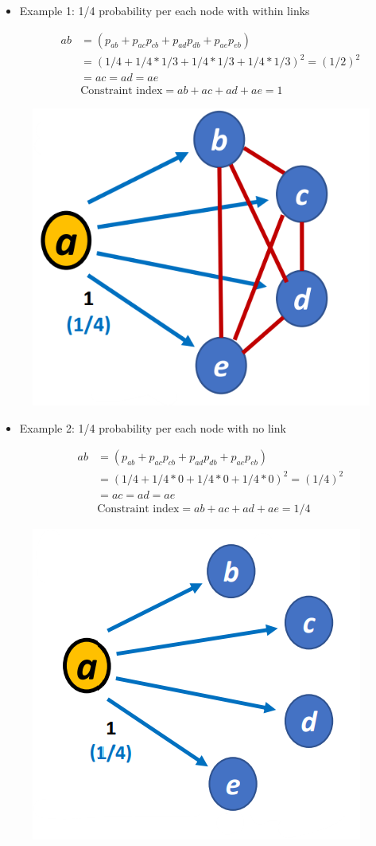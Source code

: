 \documentclass[
  notitlepage,
  onecolumn,
  openany]{book}
\begin{document}
\begin{itemize}
\item
  Example 1: 1/4 probability per each node with within links

  \[
    \begin{aligned}
    ab &= (p_{ab}+p_{ac}p_{cb}+p_{ad}p_{db}+p_{ae}p_{eb})
    \\&= (1/4+1/4*1/3+1/4*1/3+1/4*1/3)^2 =(1/2)^2 \\
    & = ac = ad = ae\\
    &\text{Constraint index} = ab+ac+ad+ae = 1
    \end{aligned}
    \]
\end{itemize}

\begin{figure}[h!]

{\centering \includegraphics[width=0.4\linewidth]{images/08-Metrics for structural holes/Untitled} 

}

\end{figure}

\begin{itemize}
\item
  Example 2: 1/4 probability per each node with no link

  \[
    \begin{aligned}
    ab &= (p_{ab}+p_{ac}p_{cb}+p_{ad}p_{db}+p_{ae}p_{eb})
    \\&= (1/4+1/4*0+1/4*0+1/4*0)^2 =(1/4)^2 \\
    & = ac = ad = ae\\
    &\text{Constraint index} = ab+ac+ad+ae = 1/4
    \end{aligned}
    \]
\end{itemize}

\begin{figure}[h!]

{\centering \includegraphics[width=0.4\linewidth]{images/08-Metrics for structural holes/Untitled 1} 

}

\end{figure}
\end{document}
